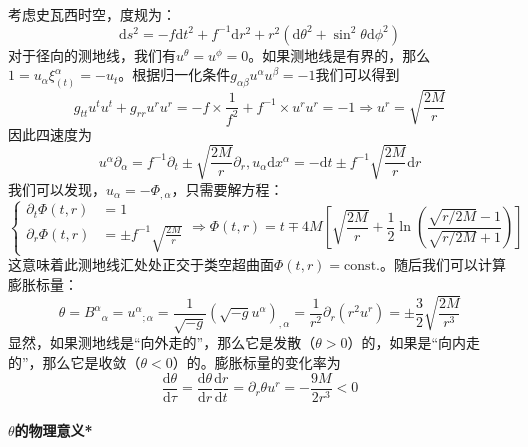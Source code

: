 \documentclass[hyperref, UTF8, a4paper]{ctexart}
\begin{document}
考虑史瓦西时空，度规为：
\begin{equation*}
	\mathrm{d} s^{2} =-f\mathrm{d} t^{2} +f^{-1}\mathrm{d} r^{2} +r^{2} (\mathrm{d} \theta ^{2} +\sin^{2} \theta \mathrm{d} \phi ^{2} )
\end{equation*}
对于径向的测地线，我们有$u^{\theta } =u^{\phi } =0$。如果测地线是有界的，那么$1=u_{\alpha } \xi _{( t)}^{\alpha } =-u_{t}$。根据归一化条件$g_{\alpha \beta } u^{\alpha } u^{\beta } =-1$我们可以得到
\begin{equation*}
	g_{tt} u^{t} u^{t} +g_{rr} u^{r} u^{r} =-f\times \frac{1}{f^{2}} +f^{-1} \times u^{r} u^{r} =-1\Rightarrow u^{r} =\sqrt{\frac{2M}{r}}
\end{equation*}
因此四速度为
\begin{equation*}
	u^{\alpha } \partial _{\alpha } =f^{-1} \partial _{t} \pm \sqrt{\frac{2M}{r}} \partial _{r} ,u_{\alpha }\mathrm{d} x^{\alpha } =-\mathrm{d} t\pm f^{-1}\sqrt{\frac{2M}{r}}\mathrm{d} r
\end{equation*}
我们可以发现，$u_{\alpha } =-\Phi _{,\alpha }$，只需要解方程：
\begin{equation*}
	\begin{cases}
		\partial _{t} \Phi ( t,r) & =1\\
		\partial _{r} \Phi ( t,r) & =\pm f^{-1}\sqrt{\frac{2M}{r}}
	\end{cases} \Rightarrow \Phi ( t,r) =t\mp 4M\left[\sqrt{\frac{2M}{r}} +\frac{1}{2}\ln\left(\frac{\sqrt{r/2M} -1}{\sqrt{r/2M} +1}\right)\right]
\end{equation*}
这意味着此测地线汇处处正交于类空超曲面$\Phi ( t,r) =\mathrm{const.}$。随后我们可以计算膨胀标量：
\begin{equation*}
	\theta =B^{\alpha }{}_{\alpha } =u^{\alpha }{}_{;\alpha } =\frac{1}{\sqrt{-g}}\left(\sqrt{-g} u^{\alpha }\right)_{,\alpha } =\frac{1}{r^{2}} \partial _{r} (r^{2} u^{r} )=\pm \frac{3}{2}\sqrt{\frac{2M}{r^{3}}}
\end{equation*}
显然，如果测地线是“向外走的”，那么它是发散（$\theta  >0$）的，如果是“向内走的”，那么它是收敛（$\theta < 0$）的。膨胀标量的变化率为
\begin{equation*}
	\frac{\mathrm{d} \theta }{\mathrm{d} \tau } =\frac{\mathrm{d} \theta }{\mathrm{d} r}\frac{\mathrm{d} r}{\mathrm{d} t} =\partial _{r} \theta u^{r} =-\frac{9M}{2r^{3}} < 0
\end{equation*}
\paragraph{$\theta $的物理意义*}
\end{document}

